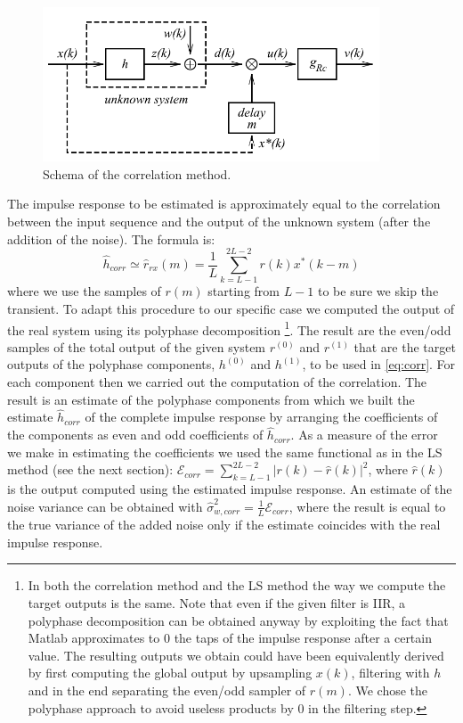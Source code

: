 \documentclass[a4paper,11.5pt]{article}
\begin{document}
\begin{figure}[ht]
	\begin{center}    
		\includegraphics[width=10cm]{figs/systemID.png}
		\caption{Schema of the correlation method.}
		\label{fig:systID}
	\end{center}
\end{figure} 

\noindent The impulse response to be estimated is approximately equal to the correlation between the input sequence and the output of the unknown system (after the addition of the noise). The formula is:
\begin{equation} \label{eq:corr}
\hat{h}_{corr}\simeq\hat{r}_{rx}(m)= \frac{1}{L} \sum_{k=L-1}^{2L-2}r(k)x^*(k-m)
\end{equation}
\noindent where we use the samples of $r(m)$ starting from $L-1$ to be sure we skip the transient. To adapt this procedure to our specific case we computed the output of the real system using its polyphase decomposition \footnote{In both the correlation method and the LS method the way we compute the target outputs is the same. Note that even if the given filter is IIR, a polyphase decomposition can be obtained anyway by exploiting the fact that Matlab approximates to 0 the taps of the impulse response after a certain value. The resulting outputs we obtain could have been equivalently derived by first computing the global output by upsampling $x(k)$, filtering with $h$ and in the end separating the even/odd sampler of $r(m)$. We chose the polyphase approach to avoid useless products by 0 in the filtering step.}. The result are the even/odd samples of the total output of the given system $r^{(0)}$ and $r^{(1)}$ that are the target outputs of the polyphase components, $h^{(0)}$ and $h^{(1)}$, to be used in \ref{eq:corr}. For each component then we carried out the computation of the correlation. The result is an estimate of the polyphase components from which we built the estimate $\hat{h}_{corr}$ of the complete impulse response by arranging the coefficients of the components as even and odd coefficients of $\hat{h}_{corr}$. As a measure of the error we make in estimating the coefficients we used the same functional as in the LS method (see the next section): $\mathcal{E}_{corr} = \sum_{k=L-1}^{2L-2}|r(k)-\hat{r}(k)|^2$, where $\hat{r}(k)$ is the output computed using the estimated impulse response. An estimate of the noise variance can be obtained with $\hat{\sigma}_{w,corr}^2=\frac{1}{L}\mathcal{E}_{corr} $, where the result is equal to the true variance of the added noise only if the estimate coincides with the real impulse response.
\end{document}
